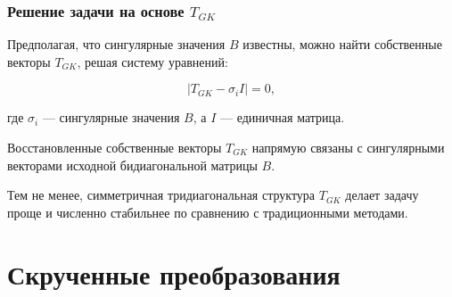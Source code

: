 \documentclass[12pt, a4paper]{report}
\theoremstyle{note}
\begin{document}
\subsection{Решение задачи на основе \( T_{GK} \)}

Предполагая, что сингулярные значения \( B \) известны, можно найти собственные векторы \( T_{GK} \), решая систему уравнений:

\begin{equation}
| T_{GK} - \sigma_i I | = 0,
\end{equation}

где \( \sigma_i \) — сингулярные значения \( B \), а \( I \) — единичная матрица.

Восстановленные собственные векторы \( T_{GK} \) напрямую связаны с сингулярными векторами исходной бидиагональной матрицы \( B \).

Тем не менее, симметричная тридиагональная структура \( T_{GK} \) делает задачу проще и численно стабильнее по сравнению с традиционными методами.

\newpage
\chapter{Скрученные преобразования}

\newpage
\printbibliography
\end{document}
